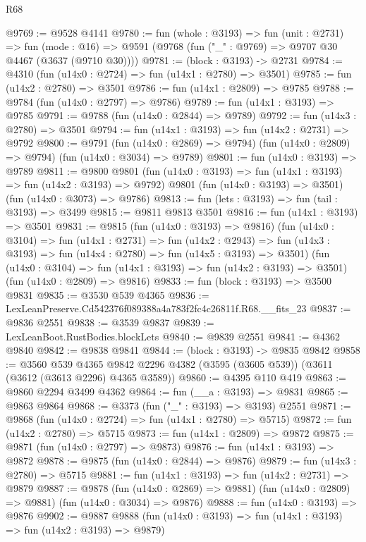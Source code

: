 \begin{lexlean}{R68}
\begin{coremodule}
@9769 := @9528 @4141
@9780 := fun (whole : @3193) =>
  fun (unit : @2731) =>
  fun (mode : @16) => @9591 (@9768 (fun ("_" : @9769) => @9707 @30 @4467 (@3637 (@9710 @30))))
@9781 := (block : @3193) -> @2731
@9784 := @4310 (fun (u14x0 : @2724) => fun (u14x1 : @2780) => @3501)
@9785 := fun (u14x2 : @2780) => @3501
@9786 := fun (u14x1 : @2809) => @9785
@9788 := @9784 (fun (u14x0 : @2797) => @9786)
@9789 := fun (u14x1 : @3193) => @9785
@9791 := @9788 (fun (u14x0 : @2844) => @9789)
@9792 := fun (u14x3 : @2780) => @3501
@9794 := fun (u14x1 : @3193) => fun (u14x2 : @2731) => @9792
@9800 := @9791
    (fun (u14x0 : @2869) => @9794)
    (fun (u14x0 : @2809) => @9794)
    (fun (u14x0 : @3034) => @9789)
@9801 := fun (u14x0 : @3193) => @9789
@9811 := @9800
    @9801
    (fun (u14x0 : @3193) => fun (u14x1 : @3193) => fun (u14x2 : @3193) => @9792)
    @9801
    (fun (u14x0 : @3193) => @3501)
    (fun (u14x0 : @3073) => @9786)
@9813 := fun (lets : @3193) => fun (tail : @3193) => @3499
@9815 := @9811 @9813 @3501
@9816 := fun (u14x1 : @3193) => @3501
@9831 := @9815
    (fun (u14x0 : @3193) => @9816)
    (fun (u14x0 : @3104) =>
    fun (u14x1 : @2731) =>
    fun (u14x2 : @2943) =>
    fun (u14x3 : @3193) => fun (u14x4 : @2780) => fun (u14x5 : @3193) => @3501)
    (fun (u14x0 : @3104) => fun (u14x1 : @3193) => fun (u14x2 : @3193) => @3501)
    (fun (u14x0 : @2809) => @9816)
@9833 := fun (block : @3193) => @3500 @9831
@9835 := @3530 @539 @4365
@9836 := LexLeanPreserve.Cd542376f089388a4a783f2fc4c26811f.R68.__fits_23
@9837 := @9836 @2551
@9838 := @3539 @9837
@9839 := LexLeanBoot.RustBodies.blockLets
@9840 := @9839 @2551
@9841 := @4362 @9840
@9842 := @9838 @9841
@9844 := (block : @3193) -> @9835 @9842
@9858 := @3560
    @539
    @4365
    @9842
    @2296
    @4382
    (@3595 (@3605 @539))
    (@3611 (@3612 (@3613 @2296) @4365 @3589))
@9860 := @4395 @110 @419
@9863 := @9860 @2294 @3499 @4362
@9864 := fun (__a : @3193) => @9831
@9865 := @9863 @9864
@9868 := @3373 (fun ("_" : @3193) => @3193) @2551
@9871 := @9868 (fun (u14x0 : @2724) => fun (u14x1 : @2780) => @5715)
@9872 := fun (u14x2 : @2780) => @5715
@9873 := fun (u14x1 : @2809) => @9872
@9875 := @9871 (fun (u14x0 : @2797) => @9873)
@9876 := fun (u14x1 : @3193) => @9872
@9878 := @9875 (fun (u14x0 : @2844) => @9876)
@9879 := fun (u14x3 : @2780) => @5715
@9881 := fun (u14x1 : @3193) => fun (u14x2 : @2731) => @9879
@9887 := @9878
    (fun (u14x0 : @2869) => @9881)
    (fun (u14x0 : @2809) => @9881)
    (fun (u14x0 : @3034) => @9876)
@9888 := fun (u14x0 : @3193) => @9876
@9902 := @9887
    @9888
    (fun (u14x0 : @3193) => fun (u14x1 : @3193) => fun (u14x2 : @3193) => @9879)

\end{coremodule}
\end{lexlean}
